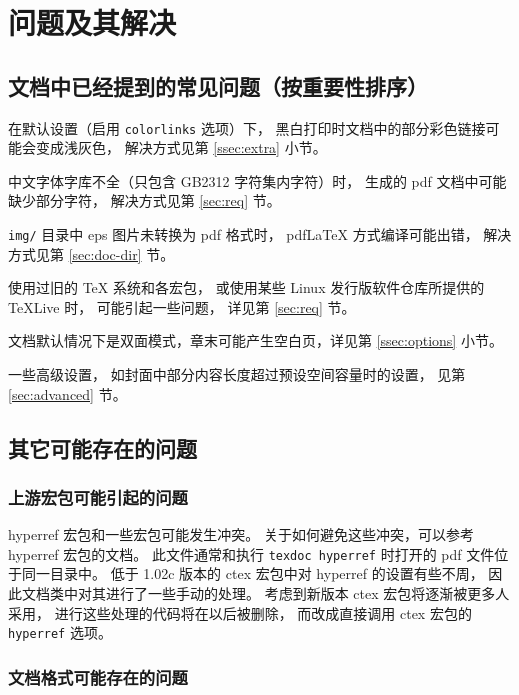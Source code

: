 %

\chapter{问题及其解决}
	\section{文档中已经提到的常见问题（按重要性排序）}

	在默认设置（启用 \verb|colorlinks| 选项）下，
	黑白打印时文档中的部分彩色链接可能会变成浅灰色，
	解决方式见第 \ref{ssec:extra} 小节。

	中文字体字库不全（只包含 GB2312 字符集内字符）时，
	生成的 pdf 文档中可能缺少部分字符，
	解决方式见第 \ref{sec:req} 节。

	\verb|img/| 目录中 eps 图片未转换为 pdf 格式时，%
	pdf\LaTeX{} 方式编译可能出错，
	解决方式见第 \ref{sec:doc-dir} 节。

	使用过旧的 \TeX{} 系统和各宏包，
	或使用某些 Linux 发行版软件仓库所提供的 \TeX{}Live 时，
	可能引起一些问题，
	详见第 \ref{sec:req} 节。

	文档默认情况下是双面模式，章末可能产生空白页，详见第 \ref{ssec:options} 小节。

	一些高级设置，
	如封面中部分内容长度超过预设空间容量时的设置，
	见第 \ref{sec:advanced} 节。

	\section{其它可能存在的问题}
		\subsection{上游宏包可能引起的问题}

		hyperref 宏包\supercite{hyperref}和一些宏包可能发生冲突。
		关于如何避免这些冲突，可以参考 hyperref 宏包的文档。
		此文件通常和执行 \verb|texdoc hyperref| %
		时打开的 pdf 文件位于同一目录中。
		低于 1.02c 版本的 ctex 宏包中对 hyperref 的设置有些不周，
		因此文档类中对其进行了一些手动的处理。
		考虑到新版本 ctex 宏包将逐渐被更多人采用，
		进行这些处理的代码将在以后被删除，
		而改成直接调用 ctex 宏包的 \verb|hyperref| 选项。

		\subsection{文档格式可能存在的问题}

